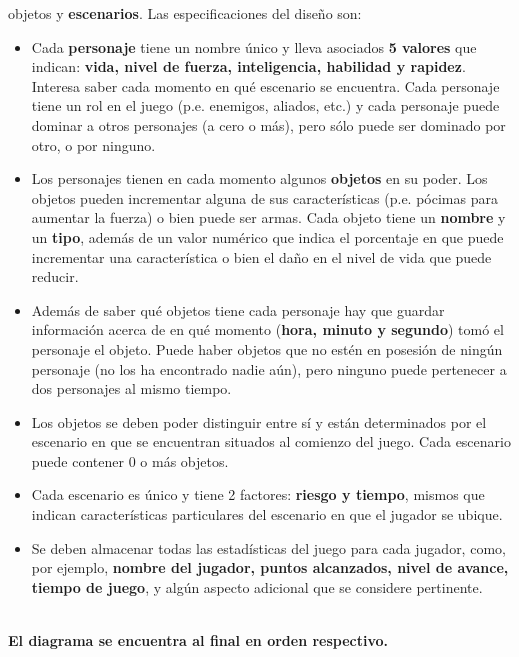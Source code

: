 \documentclass{article}
\begin{document}
\begin{enumerate}
\begin{enumerate}
{			objetos} y \textbf{escenarios}. Las especificaciones del diseño son:
				\begin{itemize}
					\item Cada \textbf{personaje} tiene un nombre único y lleva asociados \textbf{5 valores}
					que indican: \textbf{vida, nivel de fuerza, inteligencia, habilidad y rapidez}.
					Interesa saber cada momento en qué escenario se encuentra. Cada
					personaje tiene un rol en el juego (p.e. enemigos, aliados, etc.) y cada
					personaje puede dominar a otros personajes (a cero o más), pero sólo
					puede ser dominado por otro, o por ninguno.
					\item Los personajes tienen en cada momento algunos \textbf{objetos} en su poder. Los objetos pueden
					incrementar alguna de sus características (p.e. pócimas para aumentar la fuerza) o bien puede
					ser armas. Cada objeto tiene un \textbf{nombre} y un \textbf{tipo}, además de un valor numérico que indica el
					porcentaje en que puede incrementar una característica o bien el daño en el nivel de vida que
					puede reducir.
					\item Además de saber qué objetos tiene cada personaje hay que guardar información acerca de
					en qué momento (\textbf{hora, minuto y segundo}) tomó el personaje el objeto. Puede haber objetos
					que no estén en posesión de ningún personaje (no los ha encontrado nadie aún), pero ninguno
					puede pertenecer a dos personajes al mismo tiempo.
					\item Los objetos se deben poder distinguir entre sí y están determinados por el escenario en que se
					encuentran situados al comienzo del juego. Cada escenario puede contener 0 o más objetos.
					\item Cada escenario es único y tiene 2 factores: \textbf{riesgo y tiempo}, mismos que indican características
					particulares del escenario en que el jugador se ubique.
					\item Se deben almacenar todas las estadísticas del juego para cada jugador, como, por ejemplo,
					\textbf{nombre del jugador, puntos alcanzados, nivel de avance, tiempo de juego}, y algún aspecto
					adicional que se considere pertinente.\\\\
					
				\end{itemize}
			\textbf{El diagrama se encuentra al final en orden respectivo.}\\\\
			

\end{enumerate}
\end{enumerate}
\end{document}

